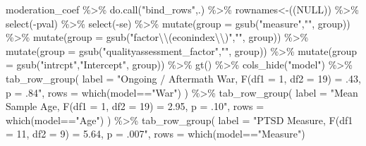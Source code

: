 \documentclass[
  letterpaper,
  DIV=11,
  numbers=noendperiod]{scrartcl}
\newenvironment{Shaded}{\begin{snugshade}}{\end{snugshade}}
\newcommand{\AttributeTok}[1]{\textcolor[rgb]{0.40,0.45,0.13}{#1}}
\newcommand{\ConstantTok}[1]{\textcolor[rgb]{0.56,0.35,0.01}{#1}}
\newcommand{\FunctionTok}[1]{\textcolor[rgb]{0.28,0.35,0.67}{#1}}
\newcommand{\NormalTok}[1]{\textcolor[rgb]{0.00,0.23,0.31}{#1}}
\newcommand{\SpecialCharTok}[1]{\textcolor[rgb]{0.37,0.37,0.37}{#1}}
\newcommand{\StringTok}[1]{\textcolor[rgb]{0.13,0.47,0.30}{#1}}
\begin{document}
\begin{Shaded}
\begin{Highlighting}[]
\NormalTok{moderation\_coef }\SpecialCharTok{\%\textgreater{}\%}
  \FunctionTok{do.call}\NormalTok{(}\StringTok{"bind\_rows"}\NormalTok{,.) }\SpecialCharTok{\%\textgreater{}\%}
  \StringTok{\textasciigrave{}}\AttributeTok{rownames\textless{}{-}}\StringTok{\textasciigrave{}}\NormalTok{((}\ConstantTok{NULL}\NormalTok{)) }\SpecialCharTok{\%\textgreater{}\%}
  \FunctionTok{select}\NormalTok{(}\SpecialCharTok{{-}}\NormalTok{pval) }\SpecialCharTok{\%\textgreater{}\%}
  \FunctionTok{select}\NormalTok{(}\SpecialCharTok{{-}}\NormalTok{se) }\SpecialCharTok{\%\textgreater{}\%}
  \FunctionTok{mutate}\NormalTok{(}\AttributeTok{group =} \FunctionTok{gsub}\NormalTok{(}\StringTok{"measure"}\NormalTok{,}\StringTok{""}\NormalTok{, group)) }\SpecialCharTok{\%\textgreater{}\%}
  \FunctionTok{mutate}\NormalTok{(}\AttributeTok{group =} \FunctionTok{gsub}\NormalTok{(}\StringTok{"factor}\SpecialCharTok{\textbackslash{}\textbackslash{}}\StringTok{(econindex}\SpecialCharTok{\textbackslash{}\textbackslash{}}\StringTok{)"}\NormalTok{,}\StringTok{""}\NormalTok{, group)) }\SpecialCharTok{\%\textgreater{}\%}
  \FunctionTok{mutate}\NormalTok{(}\AttributeTok{group =} \FunctionTok{gsub}\NormalTok{(}\StringTok{"qualityassessment\_factor"}\NormalTok{,}\StringTok{""}\NormalTok{, group)) }\SpecialCharTok{\%\textgreater{}\%}
  \FunctionTok{mutate}\NormalTok{(}\AttributeTok{group =} \FunctionTok{gsub}\NormalTok{(}\StringTok{"intrcpt"}\NormalTok{,}\StringTok{"Intercept"}\NormalTok{, group)) }\SpecialCharTok{\%\textgreater{}\%}
  \FunctionTok{gt}\NormalTok{() }\SpecialCharTok{\%\textgreater{}\%}
  \FunctionTok{cols\_hide}\NormalTok{(}\StringTok{"model"}\NormalTok{) }\SpecialCharTok{\%\textgreater{}\%}
  \FunctionTok{tab\_row\_group}\NormalTok{(}
    \AttributeTok{label =} \StringTok{"Ongoing / Aftermath War, F(df1 = 1, df2 = 19) = .43, p = .84"}\NormalTok{,}
    \AttributeTok{rows =} \FunctionTok{which}\NormalTok{(model}\SpecialCharTok{==}\StringTok{"War"}\NormalTok{)}
\NormalTok{  ) }\SpecialCharTok{\%\textgreater{}\%}
    \FunctionTok{tab\_row\_group}\NormalTok{(}
    \AttributeTok{label =} \StringTok{"Mean Sample Age, F(df1 = 1, df2 = 19) = 2.95, p = .10"}\NormalTok{,}
    \AttributeTok{rows =} \FunctionTok{which}\NormalTok{(model}\SpecialCharTok{==}\StringTok{"Age"}\NormalTok{)}
\NormalTok{  ) }\SpecialCharTok{\%\textgreater{}\%}
    \FunctionTok{tab\_row\_group}\NormalTok{(}
    \AttributeTok{label =} \StringTok{"PTSD Measure, F(df1 = 11, df2 = 9) = 5.64, p = .007"}\NormalTok{,}
    \AttributeTok{rows =} \FunctionTok{which}\NormalTok{(model}\SpecialCharTok{==}\StringTok{"Measure"}\NormalTok{)}

\end{Highlighting}
\end{Shaded}
\end{document}

